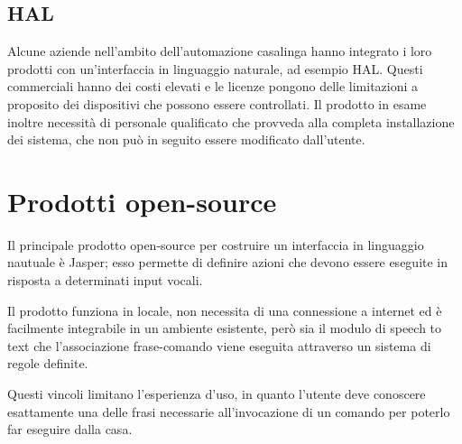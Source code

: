 \documentclass[twoside]{supsistudent}
\begin{document}
\subsection{HAL}
Alcune aziende nell'ambito dell'automazione casalinga hanno integrato i loro prodotti con un'interfaccia in linguaggio naturale, ad esempio HAL. Questi commerciali hanno dei costi elevati e le licenze pongono delle limitazioni a proposito dei dispositivi che possono essere controllati. Il prodotto in esame inoltre necessità di personale qualificato che provveda alla completa installazione dei sistema, che non può in seguito essere modificato dall'utente.\cite{HAL}

\section{Prodotti open-source}
Il principale prodotto open-source per costruire un interfaccia in linguaggio nautuale è Jasper; esso permette di definire azioni che devono essere eseguite in risposta a determinati input vocali. \cite{jasper}

Il prodotto funziona in locale, non necessita di una connessione a internet ed è facilmente integrabile in un ambiente esistente, però sia il modulo di speech to text che l'associazione frase-comando viene eseguita attraverso un sistema di regole definite.

Questi vincoli limitano l'esperienza d'uso, in quanto l'utente deve conoscere esattamente una delle frasi necessarie all'invocazione di un comando per poterlo far eseguire dalla casa.
\end{document}
